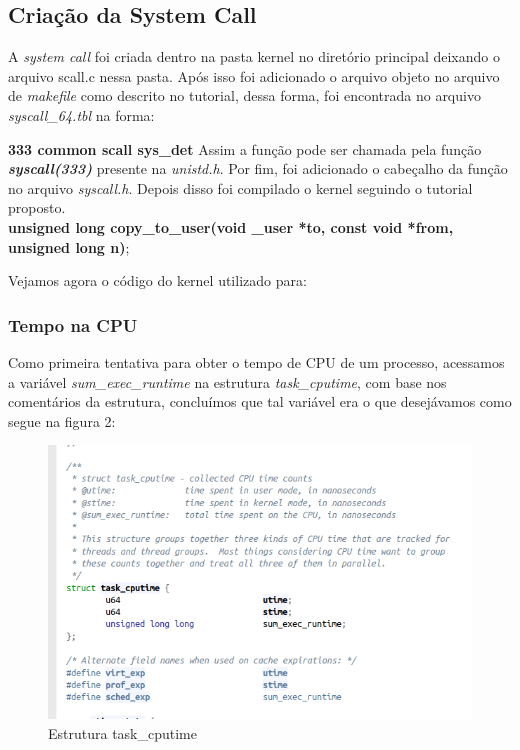 \documentclass[12pt]{article}
\begin{document}
\subsection{Criação da System Call}
A \textit{system call} foi criada dentro na pasta kernel no diretório principal deixando o arquivo  scall.c nessa pasta. Após isso foi adicionado o arquivo objeto no arquivo de \textit{makefile} como descrito no tutorial, dessa forma, foi encontrada no arquivo \textit{syscall\_64.tbl} na forma: \newline

\textbf{333	common	scall			sys\_det}
\newline
Assim a função pode ser chamada pela função \textit{\textbf{syscall(333)}} presente na \textit{unistd.h}. Por fim, foi adicionado o cabeçalho da função no arquivo \textit{syscall.h}. Depois disso foi compilado o kernel seguindo o tutorial proposto\cite{scall}. 
\\ \newline
\scriptsize{\textbf{unsigned long copy\_to\_user(void \_user *to, const void *from, unsigned long n)};}
\newline
\normalsize
	
Vejamos agora o código do kernel utilizado para:

\subsubsection{Tempo na CPU}
	Como primeira tentativa para obter o tempo de CPU de um processo, acessamos a variável \textit{sum\_exec\_runtime} na estrutura \textit{task\_cputime}, com base nos comentários da estrutura, concluímos que tal variável era o que desejávamos como segue na figura 2: %

\begin{figure}[!htb]
	\centering
	\includegraphics[scale=0.5]{imagens/img1.png}
	\caption{Estrutura task\_cputime}
	\label{taskcputime}
\end{figure}
\end{document}
